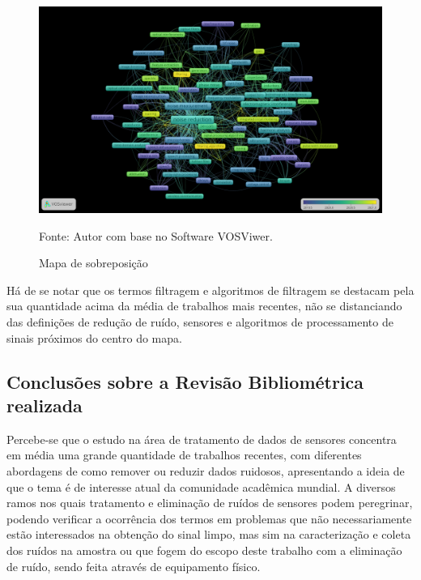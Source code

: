 \begin{figure}[H]
	\centering
	\includegraphics[width=\textwidth,height=\textwidth]{anexos/ris/IEEE/Noise_reduction_and_noise_abatement_andsensor_filtering_algorithm/overlay_visualization.png}
	\caption{Mapa de sobreposição}
	Fonte: Autor com base no Software VOSViwer.
	\label{fig: overlay_visualization}
\end{figure}

Há de se notar que os termos filtragem e algoritmos de filtragem se destacam pela sua quantidade acima da média de trabalhos mais recentes, não se distanciando das definições de redução de ruído, sensores e algoritmos de processamento de sinais próximos do centro do mapa.
 


\subsection{Conclusões sobre a Revisão Bibliométrica realizada}
Percebe-se que o estudo na área de tratamento de dados de sensores concentra em média uma grande quantidade de trabalhos recentes, com diferentes abordagens de como remover ou reduzir dados ruidosos, apresentando a ideia de que o tema é de interesse atual da comunidade acadêmica mundial. A diversos ramos nos quais tratamento e eliminação de ruídos de sensores podem peregrinar, podendo verificar a ocorrência dos termos em problemas que não necessariamente estão interessados na obtenção do sinal limpo, mas sim na caracterização e coleta dos ruídos na amostra ou que fogem do escopo deste trabalho com a eliminação de ruído, sendo feita através de equipamento físico.



